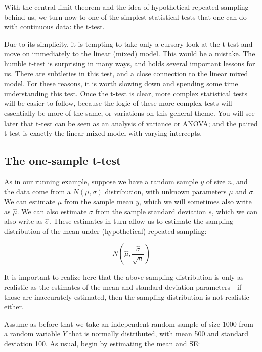 \documentclass[12pt,]{krantz}
\begin{document}
With the central limit theorem and the idea of hypothetical repeated sampling behind us, we turn now to one of the simplest statistical tests that one can do with continuous data: the t-test.

Due to its simplicity, it is tempting to take only a cursory look at the t-test and move on immediately to the linear (mixed) model. This would be a mistake. The humble t-test is surprising in many ways, and holds several important lessons for us. There are subtleties in this test, and a close connection to the linear mixed model. For these reasons, it is worth slowing down and spending some time understanding this test. Once the t-test is clear, more complex statistical tests will be easier to follow, because the logic of these more complex tests will essentially be more of the same, or variations on this general theme. You will see later that t-test can be seen as an analysis of variance or ANOVA; and the paired t-test is exactly the linear mixed model with varying intercepts.

\hypertarget{the-one-sample-t-test}{%
\subsection{The one-sample t-test}\label{the-one-sample-t-test}}

As in our running example, suppose we have a random sample \(y\) of size \(n\), and the data come from a \(N(\mu,\sigma)\) distribution, with unknown parameters \(\mu\) and \(\sigma\). We can estimate \(\mu\) from the sample mean \(\bar{y}\), which we will sometimes also write as \(\hat \mu\). We can also estimate \(\sigma\) from the sample standard deviation \(s\), which we can also write as \(\hat\sigma\). These estimates in turn allow us to estimate the sampling distribution of the mean under (hypothetical) repeated sampling:

\begin{equation}
N(\hat\mu,\frac{\hat \sigma}{\sqrt{n}})
\end{equation}

It is important to realize here that the above sampling distribution is only as realistic as the estimates of the mean and standard deviation parameters---if those are inaccurately estimated, then the sampling distribution is not realistic either.

Assume as before that we take an independent random sample of size \(1000\) from a random variable \(Y\) that is normally distributed, with mean 500 and standard deviation 100. As usual, begin by estimating the mean and SE:
\end{document}
